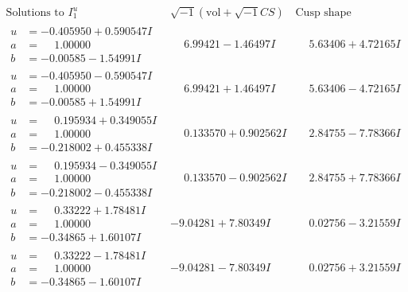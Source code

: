 \documentclass[1p]{elsarticle_modified}
\theoremstyle{definition}
\newcommand{\I}{\sqrt{-1}}
\begin{document}
$$\begin{array}{c|c|c}  
\text{Solutions to }I^u_{1}& \I (\text{vol} + \sqrt{-1}CS) & \text{Cusp shape}\\
 \hline 
\begin{aligned}
u &= -0.405950 + 0.590547 I \\
a &= \phantom{-}1.00000\phantom{ +0.000000I} \\
b &= -0.00585 - 1.54991 I\end{aligned}
 & \phantom{-}6.99421 - 1.46497 I & \phantom{-}5.63406 + 4.72165 I \\ \hline\begin{aligned}
u &= -0.405950 - 0.590547 I \\
a &= \phantom{-}1.00000\phantom{ +0.000000I} \\
b &= -0.00585 + 1.54991 I\end{aligned}
 & \phantom{-}6.99421 + 1.46497 I & \phantom{-}5.63406 - 4.72165 I \\ \hline\begin{aligned}
u &= \phantom{-}0.195934 + 0.349055 I \\
a &= \phantom{-}1.00000\phantom{ +0.000000I} \\
b &= -0.218002 + 0.455338 I\end{aligned}
 & \phantom{-}0.133570 + 0.902562 I & \phantom{-}2.84755 - 7.78366 I \\ \hline\begin{aligned}
u &= \phantom{-}0.195934 - 0.349055 I \\
a &= \phantom{-}1.00000\phantom{ +0.000000I} \\
b &= -0.218002 - 0.455338 I\end{aligned}
 & \phantom{-}0.133570 - 0.902562 I & \phantom{-}2.84755 + 7.78366 I \\ \hline\begin{aligned}
u &= \phantom{-}0.33222 + 1.78481 I \\
a &= \phantom{-}1.00000\phantom{ +0.000000I} \\
b &= -0.34865 + 1.60107 I\end{aligned}
 & -9.04281 + 7.80349 I & \phantom{-}0.02756 - 3.21559 I \\ \hline\begin{aligned}
u &= \phantom{-}0.33222 - 1.78481 I \\
a &= \phantom{-}1.00000\phantom{ +0.000000I} \\
b &= -0.34865 - 1.60107 I\end{aligned}
 & -9.04281 - 7.80349 I & \phantom{-}0.02756 + 3.21559 I \\ \hline\begin{aligned}

\end{aligned}
\end{array}$$
\end{document}
